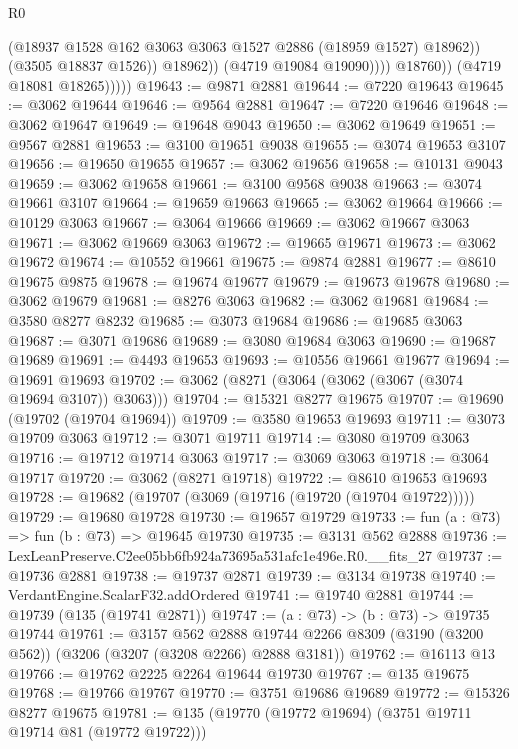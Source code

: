 \begin{lexlean}{R0}
\begin{coremodule}
                              (@18937 @1528 @162 @3063 @3063 @1527 @2886 (@18959 @1527) @18962))
                            (@3505 @18837 @1526))
                          @18962))
                      (@4719 @19084 @19090))))
                @18760))
            (@4719 @18081 @18265)))))
@19643 := @9871 @2881
@19644 := @7220 @19643
@19645 := @3062 @19644
@19646 := @9564 @2881
@19647 := @7220 @19646
@19648 := @3062 @19647
@19649 := @19648 @9043
@19650 := @3062 @19649
@19651 := @9567 @2881
@19653 := @3100 @19651 @9038
@19655 := @3074 @19653 @3107
@19656 := @19650 @19655
@19657 := @3062 @19656
@19658 := @10131 @9043
@19659 := @3062 @19658
@19661 := @3100 @9568 @9038
@19663 := @3074 @19661 @3107
@19664 := @19659 @19663
@19665 := @3062 @19664
@19666 := @10129 @3063
@19667 := @3064 @19666
@19669 := @3062 @19667 @3063
@19671 := @3062 @19669 @3063
@19672 := @19665 @19671
@19673 := @3062 @19672
@19674 := @10552 @19661
@19675 := @9874 @2881
@19677 := @8610 @19675 @9875
@19678 := @19674 @19677
@19679 := @19673 @19678
@19680 := @3062 @19679
@19681 := @8276 @3063
@19682 := @3062 @19681
@19684 := @3580 @8277 @8232
@19685 := @3073 @19684
@19686 := @19685 @3063
@19687 := @3071 @19686
@19689 := @3080 @19684 @3063
@19690 := @19687 @19689
@19691 := @4493 @19653
@19693 := @10556 @19661 @19677
@19694 := @19691 @19693
@19702 := @3062 (@8271 (@3064 (@3062 (@3067 (@3074 @19694 @3107)) @3063)))
@19704 := @15321 @8277 @19675
@19707 := @19690 (@19702 (@19704 @19694))
@19709 := @3580 @19653 @19693
@19711 := @3073 @19709 @3063
@19712 := @3071 @19711
@19714 := @3080 @19709 @3063
@19716 := @19712 @19714 @3063
@19717 := @3069 @3063
@19718 := @3064 @19717
@19720 := @3062 (@8271 @19718)
@19722 := @8610 @19653 @19693
@19728 := @19682 (@19707 (@3069 (@19716 (@19720 (@19704 @19722)))))
@19729 := @19680 @19728
@19730 := @19657 @19729
@19733 := fun (a : @73) => fun (b : @73) => @19645 @19730
@19735 := @3131 @562 @2888
@19736 := LexLeanPreserve.C2ee05bb6fb924a73695a531afc1e496e.R0.__fits_27
@19737 := @19736 @2881
@19738 := @19737 @2871
@19739 := @3134 @19738
@19740 := VerdantEngine.ScalarF32.addOrdered
@19741 := @19740 @2881
@19744 := @19739 (@135 (@19741 @2871))
@19747 := (a : @73) -> (b : @73) -> @19735 @19744
@19761 := @3157
    @562
    @2888
    @19744
    @2266
    @8309
    (@3190 (@3200 @562))
    (@3206 (@3207 (@3208 @2266) @2888 @3181))
@19762 := @16113 @13
@19766 := @19762 @2225 @2264 @19644 @19730
@19767 := @135 @19675
@19768 := @19766 @19767
@19770 := @3751 @19686 @19689
@19772 := @15326 @8277 @19675
@19781 := @135 (@19770 (@19772 @19694) (@3751 @19711 @19714 @81 (@19772 @19722)))

\end{coremodule}
\end{lexlean}
